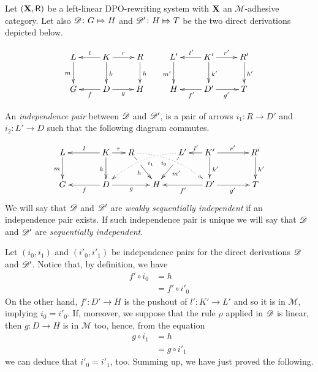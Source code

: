 \begin{definition}
  \label{de:sequential-independence}
  Let $(\textbf {\textup{X}}, \mathsf{R})$ be a left-linear DPO-rewriting system with $\textbf {\textup{X}}$ an $\mathcal{M}$-adhesive category. Let also $\mathscr{D}\colon G\Mapsto H$ and $\mathscr{D'}\colon H\Mapsto T$ be the two direct derivations depicted below.
	
	\[\xymatrix{L \ar[d]_{m}& K \ar[d]^{k}\ar[l]_{l} \ar[r]^{r} & R \ar[d]^{h} & L' \ar[d]_{m'}& K' \ar[d]^{k'}\ar[l]_{l'} \ar[r]^{r'} & R' \ar[d]^{h'}\\G & \ar[l]^{f} D \ar[r]_{g}& H & H & \ar[l]^{f'} D' \ar[r]_{g'}& T}\]
	
	An \emph{independence pair} between $\mathscr{D}$ and $\mathscr{D'}$, is a pair of  arrows $i_1\colon R\to D'$ and $i_2\colon L'\to D$ such that the following diagram commutes.
	
	\[\xymatrix@C=15pt{L \ar[d]_{m}&& K \ar[d]_{k}\ar[ll]_{l} \ar[r]^{r} & R \ar@/^.35cm/@{.>}[drrr]|(.3)\hole_(.4){i_0} \ar[dr]|(.3)\hole_{h} && L' \ar@/_.35cm/@{.>}[dlll]^(.4){i_1} \ar[dl]|(.3)\hole^{m'}& K' \ar[d]^{k'}\ar[l]_{l'} \ar[rr]^{r'} && R' \ar[d]^{h'}\\G && \ar[ll]^{f} D \ar[rr]_{g}&& H  && \ar[ll]^{f'} D' \ar[rr]_{g'}&& T}\]
	We will say that $\mathscr{D}$ and $\mathscr{D'}$ are \emph{weakly sequentially independent} if an independence pair exists. If such independence pair is unique we will say that $\mathscr{D}$ and $\mathscr{D'}$ are \emph{sequentially independent}.
\end{definition}

\begin{example}
\end{example}
\begin{example}
\end{example}


 Let $(i_0, i_1)$ and $(i'_0, i'_1)$ be independence pairs for the direct derivations $\mathscr{D}$ and $\mathscr{D'}$. Notice that, by definition, we have
	\begin{align*}f'\circ i_0&=h\\&=f'\circ i'_0
	\end{align*}
	On the other hand, 
	$f'\colon D'\to H$ is  the pushout of $l'\colon K'\to L'$ and so it is in $\mathcal{M}$, implying $i_0=i'_0$. If, moreover, we suppose that the rule $\rho$ applied in $\mathscr{D}$ is linear, then $g\colon D\to H$ is in $\mathcal{M}$ too, hence, from the equation
	\begin{align*}
		g\circ i_1&=h \\&= g\circ i'_1
	\end{align*}
	we can deduce that $i'_0=i'_1$, too. Summing up, we have just proved the following.
	

